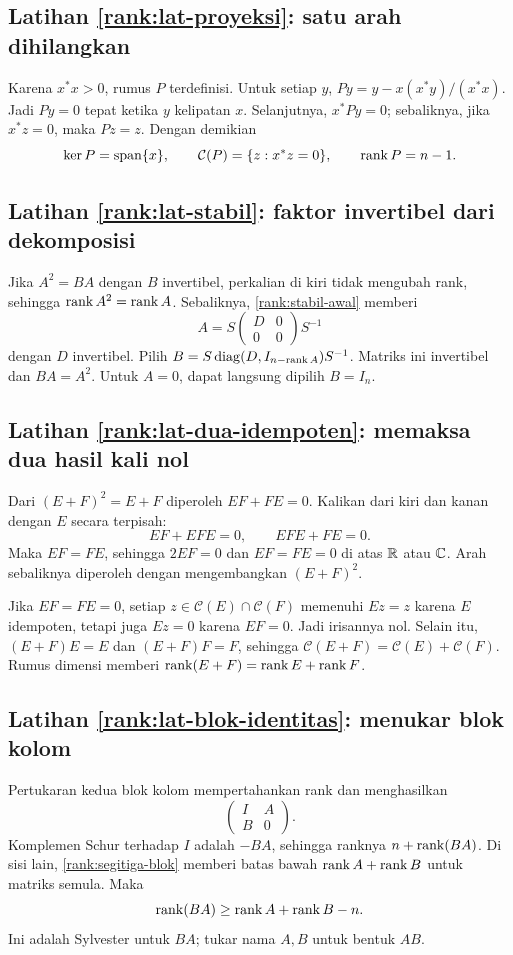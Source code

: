 \subsection*{Latihan \ref{rank:lat-proyeksi}: satu arah dihilangkan}
Karena $x^*x>0$, rumus $P$ terdefinisi. Untuk setiap $y$,
$Py=y-x(x^*y)/(x^*x)$.
Jadi $Py=0$ tepat ketika $y$ kelipatan $x$.
Selanjutnya, $x^*Py=0$; sebaliknya, jika $x^*z=0$, maka $Pz=z$.
Dengan demikian
\[
    \ker P=\operatorname{span}\{x\},\qquad
    \mathcal C(P)=\{z:x^*z=0\},\qquad \operatorname{rank} P=n-1.
\]

\subsection*{Latihan \ref{rank:lat-stabil}: faktor invertibel dari dekomposisi}
Jika $A^2=BA$ dengan $B$ invertibel, perkalian di kiri tidak
mengubah rank, sehingga $\operatorname{rank} A^2=\operatorname{rank} A$.
Sebaliknya, \autoref{rank:stabil-awal} memberi
\[
    A=S\begin{pmatrix}D&0\\0&0\end{pmatrix}S^{-1}
\]
dengan $D$ invertibel. Pilih
$B=S\operatorname{diag}(D,I_{n-\operatorname{rank} A})S^{-1}$.
Matriks ini invertibel dan $BA=A^2$.
Untuk $A=0$, dapat langsung dipilih $B=I_n$.

\subsection*{Latihan \ref{rank:lat-dua-idempoten}: memaksa dua hasil kali nol}
Dari $(E+F)^2=E+F$ diperoleh $EF+FE=0$.
Kalikan dari kiri dan kanan dengan $E$ secara terpisah:
\[
    EF+EFE=0,\qquad EFE+FE=0.
\]
Maka $EF=FE$, sehingga $2EF=0$ dan $EF=FE=0$ di atas $\mathbb{R}$ atau $\mathbb{C}$.
Arah sebaliknya diperoleh dengan mengembangkan $(E+F)^2$.

Jika $EF=FE=0$, setiap $z\in\mathcal C(E)\cap\mathcal C(F)$ memenuhi
$Ez=z$ karena $E$ idempoten, tetapi juga $Ez=0$ karena $EF=0$.
Jadi irisannya nol. Selain itu,
$(E+F)E=E$ dan $(E+F)F=F$, sehingga
$\mathcal C(E+F)=\mathcal C(E)+\mathcal C(F)$.
Rumus dimensi memberi $\operatorname{rank}(E+F)=\operatorname{rank} E+\operatorname{rank} F$.

\subsection*{Latihan \ref{rank:lat-blok-identitas}: menukar blok kolom}
Pertukaran kedua blok kolom mempertahankan rank dan menghasilkan
\[
    \begin{pmatrix}I&A\\B&0\end{pmatrix}.
\]
Komplemen Schur terhadap $I$ adalah $-BA$, sehingga ranknya
$n+\operatorname{rank}(BA)$.
Di sisi lain, \autoref{rank:segitiga-blok} memberi batas bawah
$\operatorname{rank} A+\operatorname{rank} B$ untuk matriks semula. Maka
\[
    \operatorname{rank}(BA)\ge\operatorname{rank} A+\operatorname{rank} B-n.
\]
Ini adalah Sylvester untuk $BA$; tukar nama $A,B$ untuk bentuk $AB$.

